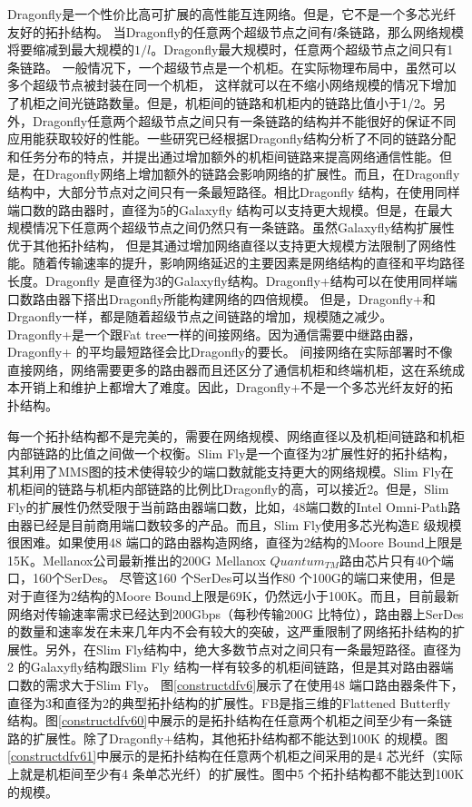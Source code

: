Dragonfly是一个性价比高可扩展的高性能互连网络。但是，它不是一个多芯光纤友好的拓扑结构。
当Dragonfly的任意两个超级节点之间有$l$条链路，那么网络规模将要缩减到最大规模的$1/l$。Dragonfly最大规模时，任意两个超级节点之间只有1条链路。
一般情况下，一个超级节点是一个机柜。在实际物理布局中，虽然可以多个超级节点被封装在同一个机柜，
这样就可以在不缩小网络规模的情况下增加了机柜之间光链路数量。但是，机柜间的链路和机柜内的链路比值小于1/2。另外，Dragonfly任意两个超级节点之间只有一条链路的结构并不能很好的保证不同应用能获取较好的性能。一些研究已经根据Dragonfly结构分析了不同的链路分配和任务分布的特点，并提出通过增加额外的机柜间链路来提高网络通信性能。但是，在Dragonfly网络上增加额外的链路会影响网络的扩展性。而且，在Dragonfly结构中，大部分节点对之间只有一条最短路径。相比Dragonfly 结构，在使用同样端口数的路由器时，直径为5的Galaxyfly 结构可以支持更大规模。但是，在最大规模情况下任意两个超级节点之间仍然只有一条链路。虽然Galaxyfly结构扩展性优于其他拓扑结构，
但是其通过增加网络直径以支持更大规模方法限制了网络性能。随着传输速率的提升，影响网络延迟的主要因素是网络结构的直径和平均路径长度。Dragonfly
是直径为3的Galaxyfly结构。Dragonfly+结构可以在使用同样端口数路由器下搭出Dragonfly所能构建网络的四倍规模。
但是，Dragonfly+和Drgaonfly一样，都是随着超级节点之间链路的增加，规模随之减少。Dragonfly+是一个跟Fat tree一样的间接网络。因为通信需要中继路由器，Dragonfly+ 的平均最短路径会比Dragonfly的要长。
间接网络在实际部署时不像直接网络，网络需要更多的路由器而且还区分了通信机柜和终端机柜，这在系统成本开销上和维护上都增大了难度。因此，Dragonfly+不是一个多芯光纤友好的拓扑结构。

每一个拓扑结构都不是完美的，需要在网络规模、网络直径以及机柜间链路和机柜内部链路的比值之间做一个权衡。Slim Fly是一个直径为2扩展性好的拓扑结构，其利用了MMS图的技术使得较少的端口数就能支持更大的网络规模。Slim Fly在机柜间的链路与机柜内部链路的比例比Dragonfly的高，可以接近2。但是，Slim Fly的扩展性仍然受限于当前路由器端口数，比如，48端口数的Intel Omni-Path路由器已经是目前商用端口数较多的产品。而且，Slim Fly使用多芯光构造E 级规模很困难。如果使用48 端口的路由器构造网络，直径为2结构的Moore Bound上限是15K。Mellanox公司最新推出的200G Mellanox $Quantum_{TM}$路由芯片只有40个端口，160个SerDes。 尽管这160 个SerDes可以当作80 个100G的端口来使用，但是对于直径为2结构的Moore Bound上限是69K，仍然远小于100K。而且，目前最新网络对传输速率需求已经达到200Gbps（每秒传输200G 比特位），路由器上SerDes的数量和速率发在未来几年内不会有较大的突破，这严重限制了网络拓扑结构的扩展性。另外，在Slim Fly结构中，绝大多数节点对之间只有一条最短路径。直径为2 的Galaxyfly结构跟Slim Fly 结构一样有较多的机柜间链路，但是其对路由器端口数的需求大于Slim Fly。 图\ref{constructdfv6}展示了在使用48 端口路由器条件下，直径为3和直径为2的典型拓扑结构的扩展性。FB是指三维的Flattened Butterfly 结构。图\ref{constructdfv60}中展示的是拓扑结构在任意两个机柜之间至少有一条链路的扩展性。除了Dragonfly+结构，其他拓扑结构都不能达到100K 的规模。图\ref{constructdfv61}中展示的是拓扑结构在任意两个机柜之间采用的是4 芯光纤（实际上就是机柜间至少有4 条单芯光纤）的扩展性。图中5 个拓扑结构都不能达到100K 的规模。

